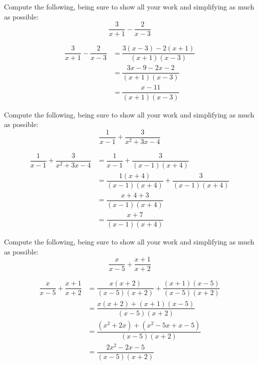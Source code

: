 \documentclass[11pt,letterpaper]{article}
\begin{document}

 Compute the following, being sure to show all your work and simplifying as much as possible:
	\[
	\dfrac{3}{x + 1} - \dfrac{2}{x - 3}
	\] \pspace

\sol
	\[
	\begin{aligned}
	\dfrac{3}{x + 1} - \dfrac{2}{x - 3}&= \dfrac{3(x - 3) - 2(x + 1)}{(x + 1)(x - 3)} \\[0.3cm]
	&= \dfrac{3x - 9 - 2x - 2}{(x + 1)(x - 3)} \\[0.3cm]
	&= \dfrac{x - 11}{(x + 1)(x - 3)}
	\end{aligned}
	\]





\newpage





 Compute the following, being sure to show all your work and simplifying as much as possible:
	\[
	\dfrac{1}{x - 1} + \dfrac{3}{x^2 + 3x - 4}
	\] \pspace

\sol
	\[
	\begin{aligned}
	\dfrac{1}{x - 1} + \dfrac{3}{x^2 + 3x - 4}&= \dfrac{1}{x - 1} + \dfrac{3}{(x - 1)(x + 4)} \\[0.3cm]
	&= \dfrac{1(x + 4)}{(x - 1)(x + 4)} + \dfrac{3}{(x - 1)(x + 4)} \\[0.3cm]
	&= \dfrac{x + 4 + 3}{(x - 1)(x + 4)} \\[0.3cm]
	&= \dfrac{x + 7}{(x - 1)(x + 4)}
	\end{aligned}
	\]





\newpage





 Compute the following, being sure to show all your work and simplifying as much as possible:
	\[
	\dfrac{x}{x - 5} + \dfrac{x + 1}{x + 2}
	\] \pspace

\sol
	\[
	\begin{aligned}
	\dfrac{x}{x - 5} + \dfrac{x + 1}{x + 2}&= \dfrac{x(x + 2)}{(x - 5)(x + 2)} + \dfrac{(x + 1)(x - 5)}{(x - 5)(x + 2)} \\[0.3cm]
	&= \dfrac{x(x + 2) + (x + 1)(x - 5)}{(x - 5)(x + 2)} \\[0.3cm]
	&= \dfrac{(x^2 + 2x) + (x^2 - 5x + x - 5)}{(x - 5)(x + 2)} \\[0.3cm]
	&= \dfrac{2x^2 - 2x - 5}{(x - 5)(x + 2)}
	\end{aligned}
	\]
\end{document}

